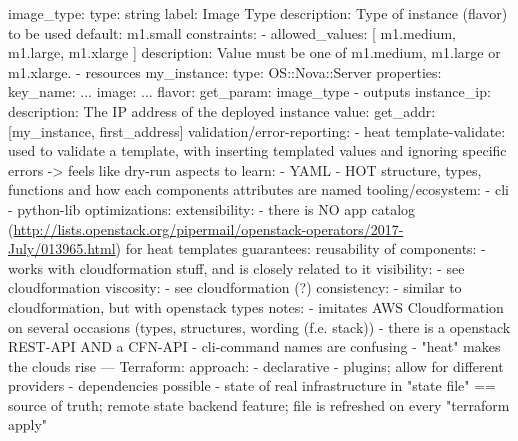         image\_type:
          type: string %
          label: Image Type
          description: Type of instance (flavor) to be used
          default: m1.small %
          constraints:
            - allowed\_values: [ m1.medium, m1.large, m1.xlarge ]
              description: Value must be one of m1.medium, m1.large or m1.xlarge.
    - resources %
        my\_instance:
          type: OS::Nova::Server
          properties:
            key\_name: ...
            image: ...
            flavor: { get\_param: image\_type }
    - outputs
        instance\_ip:
          description: The IP address of the deployed instance
          value: { get\_addr: [my\_instance, first\_address] } %
  validation/error-reporting:
    - heat template-validate: used to validate a template, with inserting templated values and ignoring specific errors -> feels like dry-run
  aspects to learn:
    - YAML
    - HOT structure, types, functions and how each components attributes are named
  tooling/ecosystem:
    - cli
    - python-lib
  optimizations: %
  extensibility:
    - there is NO app catalog (\url{http://lists.openstack.org/pipermail/openstack-operators/2017-July/013965.html}) for heat templates
  guarantees: %
  reusability of components:
    - works with cloudformation stuff, and is closely related to it
  visibility:
    - see cloudformation
  viscosity:
    - see cloudformation (?)
  consistency:
    - similar to cloudformation, but with openstack types
  notes:
    - imitates AWS Cloudformation on several occasions (types, structures, wording (f.e. stack))
    - there is a openstack REST-API AND a CFN-API
    - cli-command names are confusing
    - "heat" makes the clouds rise
---
Terraform:
  approach:
    - declarative
    - plugins; allow for different providers
    - dependencies possible
    - state of real infrastructure in "state file" == source of truth; remote state backend feature; file is refreshed on every "terraform apply"

